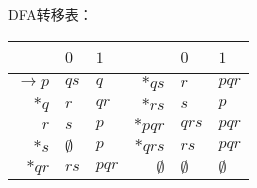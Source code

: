 \begin{solution}DFA转移表：
\begin{center}
    \begin{tabular}{r||l|l||r||l|l}
                        & $0$           & $1$   & ~             & $0$           & $1$\\ \hline \hline
        $\rightarrow p$ & $qs$          & $q$   & $*qs$         & $r$           & $pqr$\\
        $*q$            & $r$           & $qr$  & $*rs$         & $s$           & $p$\\
        $r$             & $s$           & $p$   & $*pqr$        & $qrs$         & $pqr$\\
        $*s$            & $\emptyset$   & $p$   & $*qrs$        & $rs$          & $pqr$\\
        $*qr$           & $rs$          & $pqr$ & $\emptyset$   & $\emptyset$   & $\emptyset$\\
        
    \end{tabular}
\end{center}
        








\end{solution}